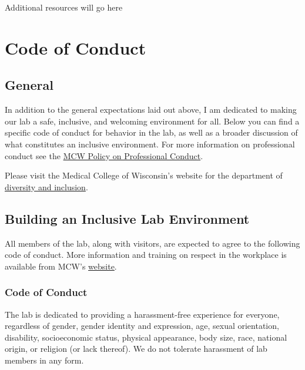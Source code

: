 \documentclass[
]{book}
\begin{document}
Additional resources will go here

\hypertarget{code}{%
\chapter{Code of Conduct}\label{code}}

\hypertarget{general}{%
\section{General}\label{general}}

In addition to the general expectations laid out above, I am dedicated to making our lab a safe, inclusive, and welcoming environment for all. Below you can find a specific code of conduct for behavior in the lab, as well as a broader discussion of what constitutes an inclusive environment. For more information on professional conduct see the \href{https://www.mcw.edu/about-mcw/non-discrimination-notice/mcw-professional-conduct-policy}{MCW Policy on Professional Conduct}.

Please visit the Medical College of Wisconsin's website for the department of \href{https://www.mcw.edu/departments/office-of-diversity-and-inclusion}{diversity and inclusion}.

\hypertarget{building-an-inclusive-lab-environment}{%
\section{Building an Inclusive Lab Environment}\label{building-an-inclusive-lab-environment}}

All members of the lab, along with visitors, are expected to agree to the following code of conduct. More information and training on respect in the workplace is available from MCW's \href{https://www1.mcw.edu/FileLibrary/Groups/FacultyAffairs/NewFacultyForms/NewFaculty-FacultyRespectTrain3.pdf}{website}.

\hypertarget{code-of-conduct}{%
\subsection{Code of Conduct}\label{code-of-conduct}}

The lab is dedicated to providing a harassment-free experience for everyone, regardless of gender, gender identity and expression, age, sexual orientation, disability, socioeconomic status, physical appearance, body size, race, national origin, or religion (or lack thereof). We do not tolerate harassment of lab members in any form.
\end{document}
